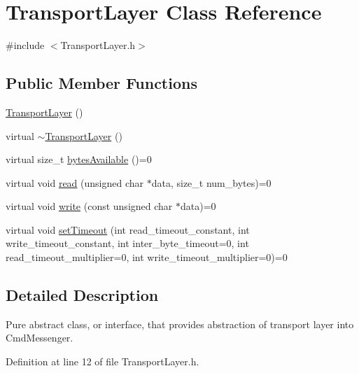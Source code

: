 \hypertarget{class_transport_layer}{\section{Transport\+Layer Class Reference}
\label{class_transport_layer}
}


{\ttfamily \#include $<$Transport\+Layer.\+h$>$}

\subsection*{Public Member Functions}
\begin{DoxyCompactItemize}
\item 
\hyperlink{class_transport_layer_a554ee40eacfdb018f103033ce000df7d}{Transport\+Layer} ()
\item 
virtual \hyperlink{class_transport_layer_a9773dfdae9b71a52d7c101fb59992fbf}{$\sim$\+Transport\+Layer} ()
\item 
virtual size\+\_\+t \hyperlink{class_transport_layer_aaf4df6f91520840b4b203c3d17c239e5}{bytes\+Available} ()=0
\item 
virtual void \hyperlink{class_transport_layer_a7854678464b710ddd88c8f225ea3951a}{read} (unsigned char $\ast$data, size\+\_\+t num\+\_\+bytes)=0
\item 
virtual void \hyperlink{class_transport_layer_aff0f73e14debf1e433bd218e9aefe399}{write} (const unsigned char $\ast$data)=0
\item 
virtual void \hyperlink{class_transport_layer_a3378e82dc61ea6d5c7416bb47dcb540e}{set\+Timeout} (int read\+\_\+timeout\+\_\+constant, int write\+\_\+timeout\+\_\+constant, int inter\+\_\+byte\+\_\+timeout=0, int read\+\_\+timeout\+\_\+multiplier=0, int write\+\_\+timeout\+\_\+multiplier=0)=0
\end{DoxyCompactItemize}


\subsection{Detailed Description}
Pure abstract class, or interface, that provides abstraction of transport layer into Cmd\+Messenger. 

Definition at line 12 of file Transport\+Layer.\+h.



